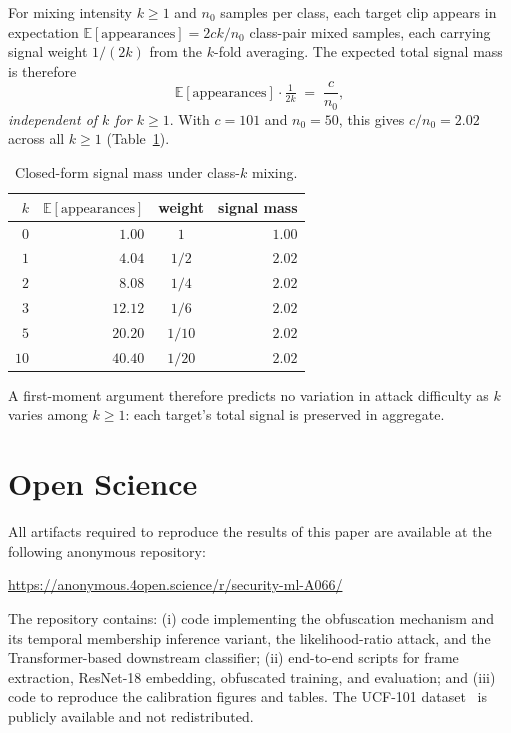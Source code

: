 \documentclass[letterpaper]{article} %
\begin{document}
For mixing intensity $k \ge 1$ and $n_0$ samples per class, each target clip appears in expectation $\mathbb{E}[\text{appearances}] = 2ck/n_0$ class-pair mixed samples, each carrying signal weight $1/(2k)$ from the $k$-fold averaging. The expected total signal mass is therefore
\[
\mathbb{E}[\text{appearances}] \cdot \tfrac{1}{2k} \;=\; \frac{c}{n_0},
\]
\emph{independent of $k$ for $k \ge 1$}. With $c = 101$ and $n_0 = 50$, this gives $c/n_0 = 2.02$ across all $k \ge 1$ (Table~\ref{tab:frame_survival}).

\begin{table}[!htbp]
\centering\small
\caption{Closed-form signal mass under class-$k$ mixing.}
\label{tab:frame_survival}
\begin{tabular}{rrcr}
\toprule
$k$ & $\mathbb{E}[\text{appearances}]$ & weight & signal mass \\
\midrule
$0$  & $1.00$  & $1$    & $1.00$ \\
$1$  & $4.04$  & $1/2$  & $2.02$ \\
$2$  & $8.08$  & $1/4$  & $2.02$ \\
$3$  & $12.12$ & $1/6$  & $2.02$ \\
$5$  & $20.20$ & $1/10$ & $2.02$ \\
$10$ & $40.40$ & $1/20$ & $2.02$ \\
\bottomrule
\end{tabular}
\end{table}

A first-moment argument therefore predicts no variation in attack difficulty as $k$ varies among $k \ge 1$: each target's total signal is preserved in aggregate.

\section{Open Science}
\label{app:open_science}

All artifacts required to reproduce the results of this paper are available at the following anonymous repository:
\begin{center}
\url{https://anonymous.4open.science/r/security-ml-A066/}
\end{center}

The repository contains: (i) code implementing the obfuscation mechanism and its temporal membership inference variant, the likelihood-ratio attack, and the Transformer-based downstream classifier; (ii) end-to-end scripts for frame extraction, ResNet-18 embedding, obfuscated training, and evaluation; and (iii) code to reproduce the calibration figures and tables. The UCF-101 dataset~\cite{soomro2012ucf101} is publicly available and not redistributed.
\end{document}
